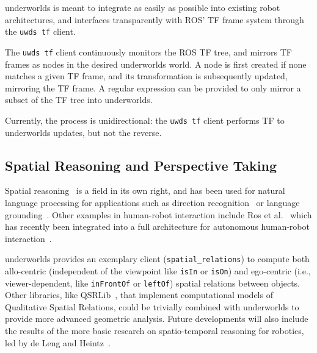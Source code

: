 \documentclass[letterpaper, 10pt, conference]{ieeeconf}
\newcommand{\etal}{et al.\xspace}
\newcommand{\ie}{i.e.,\xspace}
\newcommand{\uwds}{{\sc underworlds}\xspace}
\begin{document}
\uwds is meant to integrate as easily as possible into existing robot
architectures, and interfaces transparently with ROS' TF frame system through
the {\tt uwds tf} client.

The {\tt uwds tf} client continuously monitors the ROS TF tree, and mirrors
TF frames as nodes in the desired \uwds world. A node is first created if none
matches a given TF frame, and its transformation is subsequently updated,
mirroring the TF frame. A regular expression can be provided to only mirror a
subset of the TF tree into \uwds.

Currently, the process is unidirectional: the {\tt uwds tf} client performs TF
to \uwds updates, but not the reverse.

\subsection{Spatial Reasoning and Perspective Taking}
\label{spatial}

Spatial reasoning~\cite{O'Keefe1999} is a field in its own right, and has been
used for natural language processing for applications such as direction
recognition~\cite{Kollar2010,Matuszek2010} or language
grounding~\cite{Tellex2010}. Other examples in human-robot interaction include Ros
\etal~\cite{ros2010solving, ros2010which} which has recently been integrated
into a full architecture for autonomous human-robot
interaction~\cite{lemaignan2016artificial}.


\uwds provides an exemplary client ({\tt spatial\_relations}) to compute both
allo-centric (independent of the viewpoint like {\tt isIn} or {\tt isOn}) and
ego-centric (\ie viewer-dependent, like {\tt inFrontOf} or {\tt leftOf}) spatial relations
between objects.
Other libraries, like QSRLib~\cite{gatsoulis2016qsrlib}, that implement
computational models of Qualitative Spatial Relations, could be trivially
combined with \uwds to provide more advanced geometric analysis.
Future developments will also include the results of the more basic
research on spatio-temporal reasoning for robotics, led by de Leng and
Heintz~\cite{deleng2016qualitative}.
\end{document}
